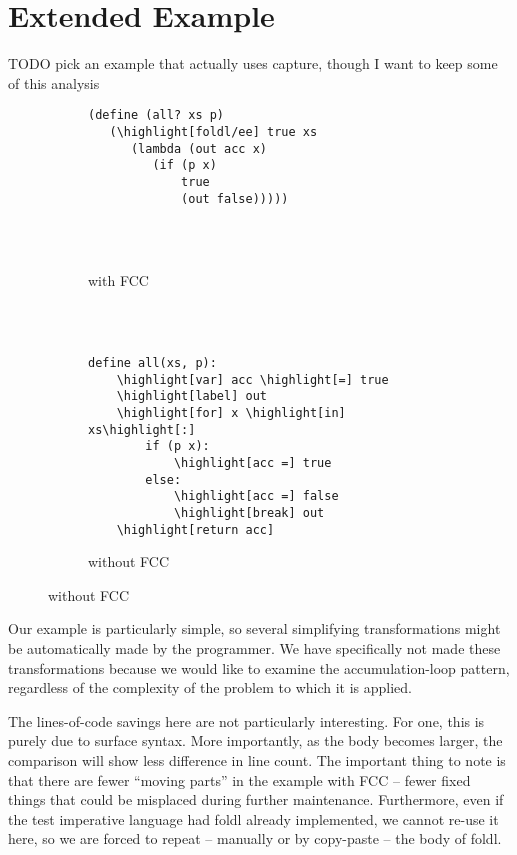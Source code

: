 \documentclass[11pt]{article}
\newcommand{\highlight}[1]{\colorbox{black!30!white}{#1}}
\begin{document}
\section{Extended Example}
\label{sec:foldl/ee}

TODO pick an example that actually uses capture, though I want to keep some of this analysis

\begin{figure}
\caption{Accumulation-loop pattern codified}
\label{fig:foldl/ee}


\begin{subfigure}[b]{0.5\textwidth}
\begin{Verbatim}[commandchars=\\\[\]]
(define (all? xs p)
   (\highlight[foldl/ee] true xs
      (lambda (out acc x)
         (if (p x)
             true
             (out false)))))




\end{Verbatim}
\caption{with FCC}
\end{subfigure}
~
\begin{subfigure}[b]{0.5\textwidth}
\begin{Verbatim}[commandchars=\\\[\]]

define all(xs, p):
    \highlight[var] acc \highlight[=] true
    \highlight[label] out
    \highlight[for] x \highlight[in] xs\highlight[:]
        if (p x):
            \highlight[acc =] true
        else:
            \highlight[acc =] false
            \highlight[break] out
    \highlight[return acc]
\end{Verbatim}
\caption{without FCC}
\end{subfigure}


\end{figure}

Our example is particularly simple, so several simplifying transformations might be automatically made by the programmer.
We have specifically not made these transformations because we would like to examine the accumulation-loop pattern, regardless of the complexity of the problem to which it is applied.

The lines-of-code savings here are not particularly interesting.
For one, this is purely due to surface syntax.
More importantly, as the body becomes larger, the comparison will show less difference in line count.
The important thing to note is that there are fewer ``moving parts'' in the example with FCC -- fewer fixed things that could be misplaced during further maintenance.
Furthermore, even if the test imperative language had foldl already implemented, we cannot re-use it here, so we are forced to repeat -- manually or by copy-paste -- the body of foldl.
\end{document}
